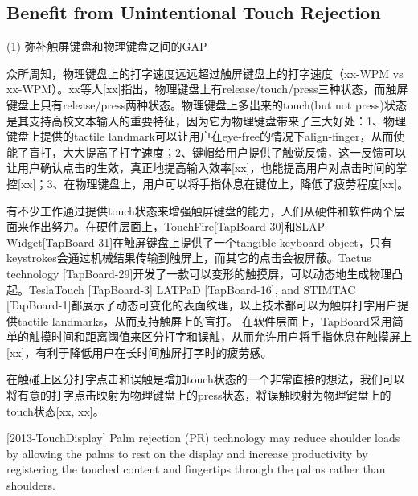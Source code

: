 
\subsection{Benefit from Unintentional Touch Rejection}

(1) 弥补触屏键盘和物理键盘之间的GAP

众所周知，物理键盘上的打字速度远远超过触屏键盘上的打字速度（xx-WPM vs xx-WPM）。xx等人[xx]指出，物理键盘上有release/touch/press三种状态，而触屏键盘上只有release/press两种状态。物理键盘上多出来的touch(but not press)状态是其支持高校文本输入的重要特征，因为它为物理键盘带来了三大好处：1、物理键盘上提供的tactile landmark可以让用户在eye-free的情况下align-finger，从而使能了盲打，大大提高了打字速度；2、键帽给用户提供了触觉反馈，这一反馈可以让用户确认点击的生效，真正地提高输入效率[xx]，也能提高用户对点击时间的掌控[xx]；3、在物理键盘上，用户可以将手指休息在键位上，降低了疲劳程度[xx]。

有不少工作通过提供touch状态来增强触屏键盘的能力，人们从硬件和软件两个层面来作出努力。在硬件层面上，TouchFire[TapBoard-30]和SLAP Widget[TapBoard-31]在触屏键盘上提供了一个tangible keyboard object，只有keystrokes会通过机械结果传输到触屏上，而其它的点击会被屏蔽。Tactus technology [TapBoard-29]开发了一款可以变形的触摸屏，可以动态地生成物理凸起。TeslaTouch [TapBoard-3] LATPaD [TapBoard-16], and STIMTAC [TapBoard-1]都展示了动态可变化的表面纹理，以上技术都可以为触屏打字用户提供tactile landmarks，从而支持触屏上的盲打。 在软件层面上，TapBoard采用简单的触摸时间和距离阈值来区分打字和误触，从而允许用户将手指休息在触摸屏上[xx]，有利于降低用户在长时间触屏打字时的疲劳感\cite{2013-TouchDisplay}。

在触碰上区分打字点击和误触是增加touch状态的一个非常直接的想法，我们可以将有意的打字点击映射为物理键盘上的press状态，将误触映射为物理键盘上的touch状态[xx, xx]。

[2013-TouchDisplay]
Palm rejection (PR) technology may reduce shoulder loads by allowing the palms to rest on the display and increase productivity by registering the touched content and fingertips through the palms rather than shoulders.

